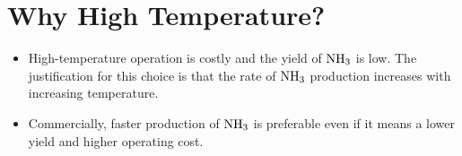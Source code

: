 \documentclass[a4paper,12pt,twocolumn]{article}
\begin{document}
\section{Why High Temperature?}
\begin{itemize}
    \item High-temperature operation is costly and the yield of $\ce{NH3}$ is low. The justification for this choice is that the rate of $\ce{NH3}$ production increases with increasing temperature.
    \item Commercially, faster production of $\ce{NH3}$ is preferable even if it means a lower yield and higher operating cost.
\end{itemize}
\end{document}
